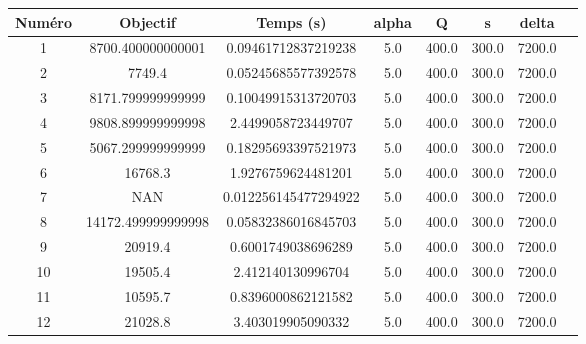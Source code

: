 \begin{tabular}{|c|c|c|c|c|c|c|c|}
\hline
 Numéro & Objectif & Temps (s) & alpha & Q & s & delta \\
\hline
1 & 8700.400000000001 & 0.09461712837219238 & 5.0 & 400.0 & 300.0 & 7200.0 \\ 
 \hline
2 & 7749.4 & 0.05245685577392578 & 5.0 & 400.0 & 300.0 & 7200.0 \\ 
 \hline
3 & 8171.799999999999 & 0.10049915313720703 & 5.0 & 400.0 & 300.0 & 7200.0 \\ 
 \hline
4 & 9808.899999999998 & 2.4499058723449707 & 5.0 & 400.0 & 300.0 & 7200.0 \\ 
 \hline
5 & 5067.299999999999 & 0.18295693397521973 & 5.0 & 400.0 & 300.0 & 7200.0 \\ 
 \hline
6 & 16768.3 & 1.9276759624481201 & 5.0 & 400.0 & 300.0 & 7200.0 \\ 
 \hline
7 & NAN & 0.012256145477294922 & 5.0 & 400.0 & 300.0 & 7200.0 \\ 
 \hline
8 & 14172.499999999998 & 0.05832386016845703 & 5.0 & 400.0 & 300.0 & 7200.0 \\ 
 \hline
9 & 20919.4 & 0.6001749038696289 & 5.0 & 400.0 & 300.0 & 7200.0 \\ 
 \hline
10 & 19505.4 & 2.412140130996704 & 5.0 & 400.0 & 300.0 & 7200.0 \\ 
 \hline
11 & 10595.7 & 0.8396000862121582 & 5.0 & 400.0 & 300.0 & 7200.0 \\ 
 \hline
12 & 21028.8 & 3.403019905090332 & 5.0 & 400.0 & 300.0 & 7200.0 \\ 
 \hline
\end{tabular}
